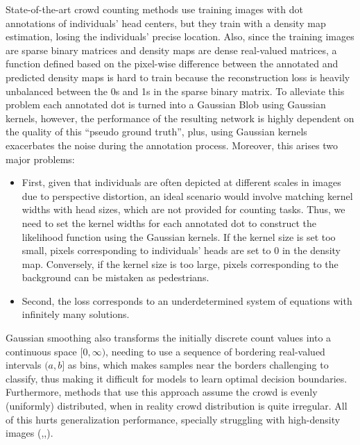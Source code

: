 State-of-the-art crowd counting methods use training images with dot annotations of individuals' head centers, but they train with a density map estimation, losing the individuals' precise location. Also, since the training images are sparse binary matrices and density maps are dense real-valued matrices, a function defined based on the pixel-wise difference between the annotated and predicted density maps is hard to train because the reconstruction loss is heavily unbalanced between the 0s and 1s in the sparse binary matrix. To alleviate this problem each annotated dot is turned into a Gaussian Blob using Gaussian kernels, however, the performance of the resulting network is highly dependent on the quality of this ``pseudo ground truth'', plus, using Gaussian kernels exacerbates the noise during the annotation process. Moreover, this arises two major problems: 
\begin{itemize}
    \item First, given that individuals are often depicted at different scales in images due to perspective distortion, an ideal scenario would involve matching kernel widths with head sizes, which are not provided for counting tasks. Thus, we need to set the kernel widths for each annotated dot to construct the likelihood function using the Gaussian kernels. If the kernel size is set too small, pixels corresponding to individuals' heads are set to 0 in the density map. Conversely, if the kernel size is too large, pixels corresponding to the background can be mistaken as pedestrians. %
    \item Second, the loss corresponds to an underdetermined system of equations with infinitely many solutions.
\end{itemize}
Gaussian smoothing also transforms the initially discrete count values into a continuous space $[0,\infty)$, needing to use a sequence of bordering real-valued intervals $(a,b]$ as bins, which makes samples near the borders challenging to classify, thus making it difficult for models to learn optimal decision boundaries.
Furthermore, methods that use this approach assume the crowd is evenly (uniformly) distributed, when in reality crowd distribution is quite irregular. All of this hurts generalization performance, specially struggling with high-density images (\cite{CLIP},\cite{DMCount},\cite{FGENet}).\\

